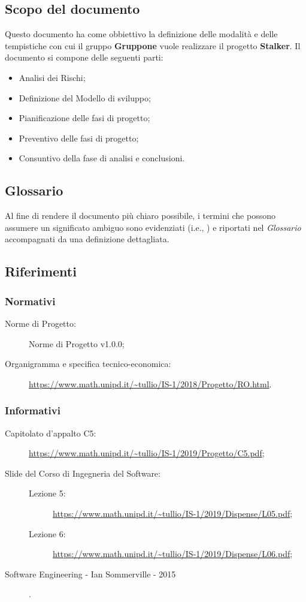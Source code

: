 \documentclass[../piano-di-progetto.tex]{subfiles}
\begin{document}
\subsection{Scopo del documento}%
\label{sub:scopo_del_documento}
Questo documento ha come obbiettivo la definizione delle modalità e delle tempistiche con cui il gruppo \textbf{Gruppone} vuole realizzare il progetto \textbf{Stalker}.
Il documento si compone delle seguenti parti:
\begin{itemize}
  \item Analisi dei Rischi;
  \item Definizione del Modello di sviluppo;
  \item Pianificazione delle fasi di progetto;
  \item Preventivo delle fasi di progetto;
  \item Consuntivo della fase di analisi e conclusioni.
\end{itemize}
\subsection{Glossario}%
\label{sub:glossario}
Al fine di rendere il documento più chiaro possibile, i termini che possono assumere un significato ambiguo sono evidenziati (i.e., ) e riportati nel \textit{Glossario} accompagnati da una definizione dettagliata.
\subsection{Riferimenti}%
\label{sub:riferimenti}
\subsubsection{Normativi}%
\label{subs:normativi}
\begin{description}
  \item[Norme di Progetto:] Norme di Progetto v1.0.0;
  \item[Organigramma e specifica tecnico-economica:] \url{https://www.math.unipd.it/~tullio/IS-1/2018/Progetto/RO.html}.
\end{description}
\subsubsection{Informativi}%
\label{subs:informativi}
\begin{description}
  \item[Capitolato d'appalto C5:] \url{https://www.math.unipd.it/~tullio/IS-1/2019/Progetto/C5.pdf};
  \item[Slide del Corso di Ingegneria del Software:] 
  \begin{description}
        \item[Lezione 5:] \url{https://www.math.unipd.it/~tullio/IS-1/2019/Dispense/L05.pdf};
        \item[Lezione 6:] \url{https://www.math.unipd.it/~tullio/IS-1/2019/Dispense/L06.pdf};
  \end{description}
  \item[Software Engineering - Ian Sommerville - 2015].
\end{description}%
\end{document}

